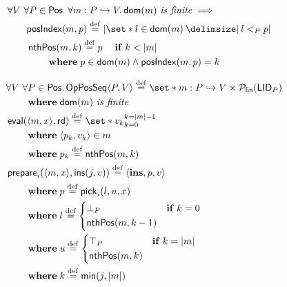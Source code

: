 \begin{align*}
\MoveEqLeft \forall V \ \forall P \in \trm{Pos} \ \forall m: P \pto V \qsep \trm{dom}(m)\ \textit{is finite} \implies\\
%
&\begin{aligned}
\trm{posIndex}&(m, p) \defeq%
\card*{\set*{l \in \trm{dom}(m) \given l <_P p}}
\end{aligned}\\
%
&\begin{aligned}
\MoveEqLeft \trm{nthPos}(m, k) \defeq p \quad\when k < \card*{m}\\
&\where p \in \trm{dom}(m) \land \trm{posIndex}(m, p) = k
\end{aligned}
%
\end{align*}

\begin{figure}[htb]
\begin{align*}
&\begin{aligned}
\MoveEqLeft \forall V\ \forall P \in \trm{Pos} \qsep \trm{OpPosSeq}\tuple*{P, V} \defeq \set*{m:P \pto V} \times \powerfset{\trm{LID}_P}\\
&\where \trm{dom}(m)\ \textit{is finite}
\end{aligned}\\
%
&\begin{aligned}
\MoveEqLeft \trm{eval}(\tuple*{m, x}, \trm{rd}) \defeq \set*{v_k}_{k=0}^{k=\card*{m} - 1}\\
& \where \tuple*{p_k, v_k} \in m\\
& \where p_k \defeq \trm{nthPos}(m, k)
\end{aligned}\\
%
&\begin{aligned}
\MoveEqLeft \trm{prepare}_i(\tuple*{m,x}, \trm{ins}(j, v)) \defeq \tuple*{\textbf{ins}, p, v}\\
&\where p \defeq \trm{pick}_i(l, u, x)\\
&\where l \defeq \begin{dcases}
  \bot_P & \when k = 0\\
  \trm{nthPos}(m, k - 1) &
\end{dcases}\\
&\where u \defeq \begin{dcases}
  \top_P & \when k = \card*{m}\\
  \trm{nthPos}(m, k) &
\end{dcases}\\
&\where k \defeq \trm{min}(j, \card*{m})
\end{aligned}\\

\end{align*}
\end{figure}
